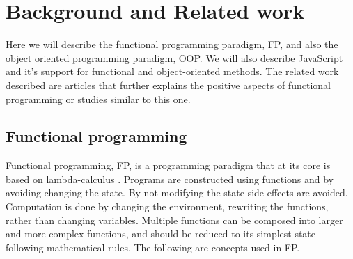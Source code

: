 \documentclass {article}
\begin{document}
\section{Background and Related work}
Here we will describe the functional programming paradigm, FP, and also the object oriented programming paradigm, OOP. We will also describe JavaScript and it's support for functional and object-oriented methods. The related work described are articles that further explains the positive aspects of functional programming or studies similar to this one.
\subsection{Functional programming}
Functional programming, FP, is a programming paradigm that at its core is based on lambda-calculus \cite{gabmar}. Programs are constructed using functions and by avoiding changing the state. By not modifying the state side effects are avoided. Computation is done by changing the environment, rewriting the functions, rather than changing variables. Multiple functions can be composed into larger and more complex functions, and should be reduced to its simplest state following mathematical rules. The following are concepts used in FP.
\end{document}

